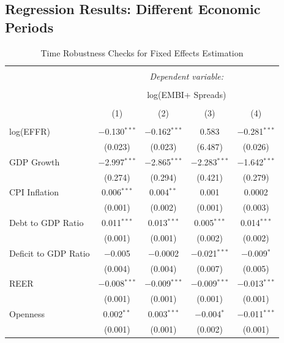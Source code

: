 \documentclass[12pt]{article}
\begin{document}
\subsection{Regression Results: Different Economic Periods}
\FloatBarrier
\begin{table}[h!] \centering 
  \caption{Time Robustness Checks for Fixed Effects Estimation} 
  \label{tbl8} 
\scriptsize 
\begin{tabular}{@{\extracolsep{5pt}}lcccc} 
\\[-1.8ex]\hline 
\hline \\[-1.8ex] 
 & \multicolumn{4}{c}{\textit{Dependent variable:}} \\ 
\cline{2-5} 
\\[-1.8ex] & \multicolumn{4}{c}{log(EMBI+ Spreads)} \\ 
\\[-1.8ex] & (1) & (2) & (3) & (4)\\ 
\hline \\[-1.8ex] 
 log(EFFR) & $-$0.130$^{***}$ & $-$0.162$^{***}$ & 0.583 & $-$0.281$^{***}$ \\ 
  & (0.023) & (0.023) & (6.487) & (0.026) \\ 
  GDP Growth & $-$2.997$^{***}$ & $-$2.865$^{***}$ & $-$2.283$^{***}$ & $-$1.642$^{***}$ \\ 
  & (0.274) & (0.294) & (0.421) & (0.279) \\ 
  CPI Inflation & 0.006$^{***}$ & 0.004$^{**}$ & 0.001 & 0.0002 \\ 
  & (0.001) & (0.002) & (0.001) & (0.003) \\ 
  Debt to GDP Ratio & 0.011$^{***}$ & 0.013$^{***}$ & 0.005$^{***}$ & 0.014$^{***}$ \\ 
  & (0.001) & (0.001) & (0.002) & (0.002) \\ 
  Deficit to GDP Ratio & $-$0.005 & $-$0.0002 & $-$0.021$^{***}$ & $-$0.009$^{*}$ \\ 
  & (0.004) & (0.004) & (0.007) & (0.005) \\ 
  REER & $-$0.008$^{***}$ & $-$0.009$^{***}$ & $-$0.009$^{***}$ & $-$0.013$^{***}$ \\ 
  & (0.001) & (0.001) & (0.001) & (0.001) \\ 
  Openness & 0.002$^{**}$ & 0.003$^{***}$ & $-$0.004$^{*}$ & $-$0.011$^{***}$ \\ 
  & (0.001) & (0.001) & (0.002) & (0.001) \\ 

\end{tabular}
\end{table}
\end{document}
